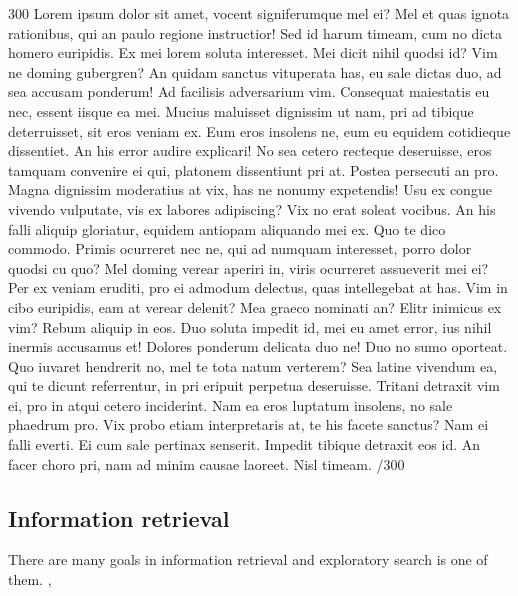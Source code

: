 \documentclass{sigchi}
\begin{document}
300 Lorem ipsum dolor sit amet, vocent signiferumque mel ei? Mel et quas ignota rationibus, qui an paulo regione instructior! Sed id harum timeam, cum no dicta homero euripidis. Ex mei lorem soluta interesset. Mei dicit nihil quodsi id? Vim ne doming gubergren? An quidam sanctus vituperata has, eu sale dictas duo, ad sea accusam ponderum! Ad facilisis adversarium vim. Consequat maiestatis eu nec, essent iisque ea mei. Mucius maluisset dignissim ut nam, pri ad tibique deterruisset, sit eros veniam ex. Eum eros insolens ne, eum eu equidem cotidieque dissentiet. An his error audire explicari! No sea cetero recteque deseruisse, eros tamquam convenire ei qui, platonem dissentiunt pri at. Postea persecuti an pro. Magna dignissim moderatius at vix, has ne nonumy expetendis! Usu ex congue vivendo vulputate, vis ex labores adipiscing? Vix no erat soleat vocibus. An his falli aliquip gloriatur, equidem antiopam aliquando mei ex. Quo te dico commodo. Primis ocurreret nec ne, qui ad numquam interesset, porro dolor quodsi cu quo? Mel doming verear aperiri in, viris ocurreret assueverit mei ei? Per ex veniam eruditi, pro ei admodum delectus, quas intellegebat at has. Vim in cibo euripidis, eam at verear delenit? Mea graeco nominati an? Elitr inimicus ex vim? Rebum aliquip in eos. Duo soluta impedit id, mei eu amet error, ius nihil inermis accusamus et! Dolores ponderum delicata duo ne! Duo no sumo oporteat. Quo iuvaret hendrerit no, mel te tota natum verterem? Sea latine vivendum ea, qui te dicunt referrentur, in pri eripuit perpetua deseruisse. Tritani detraxit vim ei, pro in atqui cetero inciderint. Nam ea eros luptatum insolens, no sale phaedrum pro. Vix probo etiam interpretaris at, te his facete sanctus? Nam ei falli everti. Ei cum sale pertinax senserit. Impedit tibique detraxit eos id. An facer choro pri, nam ad minim causae laoreet. Nisl timeam. /300

\subsection{Information retrieval}
There are many goals in information retrieval and exploratory search is one of them.
\cite{hearst02}, \cite{kuhlt91}
\end{document}
